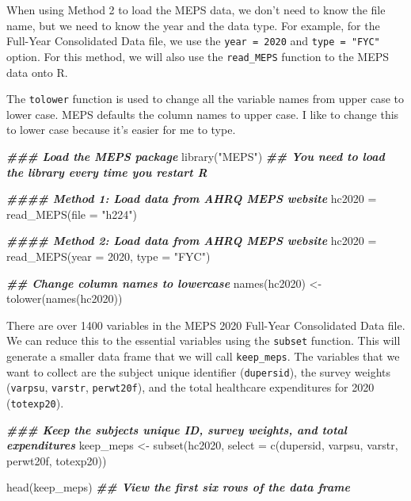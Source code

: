 \documentclass[
]{book}
\newenvironment{Shaded}{\begin{snugshade}}{\end{snugshade}}
\newcommand{\AttributeTok}[1]{\textcolor[rgb]{0.77,0.63,0.00}{#1}}
\newcommand{\DecValTok}[1]{\textcolor[rgb]{0.00,0.00,0.81}{#1}}
\newcommand{\DocumentationTok}[1]{\textcolor[rgb]{0.56,0.35,0.01}{\textbf{\textit{#1}}}}
\newcommand{\FunctionTok}[1]{\textcolor[rgb]{0.00,0.00,0.00}{#1}}
\newcommand{\NormalTok}[1]{#1}
\newcommand{\OtherTok}[1]{\textcolor[rgb]{0.56,0.35,0.01}{#1}}
\newcommand{\StringTok}[1]{\textcolor[rgb]{0.31,0.60,0.02}{#1}}
\theoremstyle{definition}
\theoremstyle{definition}
\theoremstyle{definition}
\theoremstyle{definition}
\theoremstyle{remark}
\begin{document}
When using Method 2 to load the MEPS data, we don't need to know the file name, but we need to know the year and the data type. For example, for the Full-Year Consolidated Data file, we use the \texttt{year\ =\ 2020} and \texttt{type\ =\ "FYC"} option. For this method, we will also use the \texttt{read\_MEPS} function to the MEPS data onto R.

The \texttt{tolower} function is used to change all the variable names from upper case to lower case. MEPS defaults the column names to upper case. I like to change this to lower case because it's easier for me to type.

\begin{Shaded}
\begin{Highlighting}[]
\DocumentationTok{\#\#\# Load the MEPS package}
\FunctionTok{library}\NormalTok{(}\StringTok{"MEPS"}\NormalTok{) }\DocumentationTok{\#\# You need to load the library every time you restart R}

\DocumentationTok{\#\#\#\# Method 1: Load data from AHRQ MEPS website}
\NormalTok{hc2020 }\OtherTok{=} \FunctionTok{read\_MEPS}\NormalTok{(}\AttributeTok{file =} \StringTok{"h224"}\NormalTok{)}

\DocumentationTok{\#\#\#\# Method 2: Load data from AHRQ MEPS website}
\NormalTok{hc2020 }\OtherTok{=} \FunctionTok{read\_MEPS}\NormalTok{(}\AttributeTok{year =} \DecValTok{2020}\NormalTok{, }\AttributeTok{type =} \StringTok{"FYC"}\NormalTok{)}

\DocumentationTok{\#\# Change column names to lowercase}
\FunctionTok{names}\NormalTok{(hc2020) }\OtherTok{\textless{}{-}} \FunctionTok{tolower}\NormalTok{(}\FunctionTok{names}\NormalTok{(hc2020))}
\end{Highlighting}
\end{Shaded}

There are over 1400 variables in the MEPS 2020 Full-Year Consolidated Data file. We can reduce this to the essential variables using the \texttt{subset} function. This will generate a smaller data frame that we will call \texttt{keep\_meps}. The variables that we want to collect are the subject unique identifier (\texttt{dupersid}), the survey weights (\texttt{varpsu}, \texttt{varstr}, \texttt{perwt20f}), and the total healthcare expenditures for 2020 (\texttt{totexp20}).

\begin{Shaded}
\begin{Highlighting}[]
\DocumentationTok{\#\#\# Keep the subject\textquotesingle{}s unique ID, survey weights, and total expenditures}
\NormalTok{keep\_meps }\OtherTok{\textless{}{-}} \FunctionTok{subset}\NormalTok{(hc2020, }\AttributeTok{select =} \FunctionTok{c}\NormalTok{(dupersid, varpsu, varstr, perwt20f, totexp20))}

\FunctionTok{head}\NormalTok{(keep\_meps) }\DocumentationTok{\#\# View the first six rows of the data frame}
\end{Highlighting}
\end{Shaded}
\end{document}
